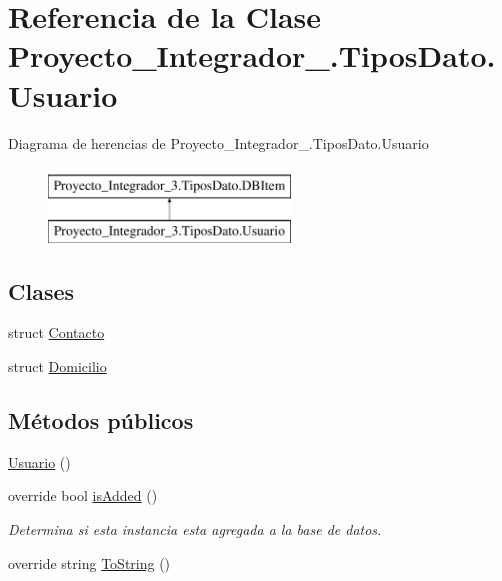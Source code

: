 \hypertarget{class_proyecto___integrador__3_1_1_tipos_dato_1_1_usuario}{\section{Referencia de la Clase Proyecto\-\_\-\-Integrador\-\_.\-Tipos\-Dato.\-Usuario}
\label{class_proyecto___integrador__3_1_1_tipos_dato_1_1_usuario}
}
Diagrama de herencias de Proyecto\-\_\-\-Integrador\-\_.\-Tipos\-Dato.\-Usuario\begin{figure}[H]
\begin{center}
\leavevmode
\includegraphics[height=2.000000cm]{d8/dc0/class_proyecto___integrador__3_1_1_tipos_dato_1_1_usuario}
\end{center}
\end{figure}
\subsection*{Clases}
\begin{DoxyCompactItemize}
\item 
struct \hyperlink{struct_proyecto___integrador__3_1_1_tipos_dato_1_1_usuario_1_1_contacto}{Contacto}
\item 
struct \hyperlink{struct_proyecto___integrador__3_1_1_tipos_dato_1_1_usuario_1_1_domicilio}{Domicilio}
\end{DoxyCompactItemize}
\subsection*{Métodos públicos}
\begin{DoxyCompactItemize}
\item 
\hyperlink{class_proyecto___integrador__3_1_1_tipos_dato_1_1_usuario_a4b727b3cfd600bbecd0f5a2673152110}{Usuario} ()
\item 
override bool \hyperlink{class_proyecto___integrador__3_1_1_tipos_dato_1_1_usuario_a6ebae0d39a68af27c93fd85719bb1664}{is\-Added} ()
\begin{DoxyCompactList}\small\item\em Determina si esta instancia esta agregada a la base de datos. \end{DoxyCompactList}\item 
override string \hyperlink{class_proyecto___integrador__3_1_1_tipos_dato_1_1_usuario_ad04ec01ff1bc03efc0d4defd5589ba52}{To\-String} ()
\end{DoxyCompactItemize}
